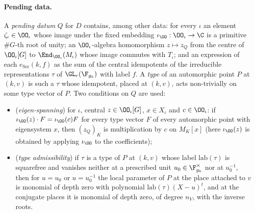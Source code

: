 \paragraph{Pending data.}
A \emph{pending datum} $Q$ for $D$ contains, among other data: for every $\iota$ an element $\zeta_\iota\in\OO_\iota$ whose image under
the fixed embedding $\iota_\OO:\OO_\iota\to\C$ is a primitive $\#G$-th root of unity; an $\OO_\iota$-algebra homomorphism $z\mapsto z_Q$
from the centre of $\OO_\iota[G]$ to $\End_{\OO_\iota}(M_\iota)$ whose image commutes with $T_\iota$; and an expression of each
$e_{\mathrm{Ser}}(k,f)$ as the sum of the central idempotents of the irreducible representations $\tau$ of $\GL_r(\F_{g_k})$ with
label $f$. A \emph{type} of an automorphic point $P$ at $(k,v)$ is such a $\tau$ whose idempotent, placed at $(k,v)$, acts non-trivially
on some type vector of $P$. Two conditions on $Q$ are used:
\begin{itemize}[leftmargin=3.2em]
\item[(Eig)] (\emph{eigen-spanning}) for $\iota$, central $z\in\OO_\iota[G]$, $x\in X_\iota$ and $c\in\OO_\iota$: if $\iota_\OO(z)\cdot F=\iota_\OO(c)F$
for every type vector $F$ of every automorphic point with eigensystem $x$, then $(z_Q)_K$ is multiplication by $c$ on $M_K[x]$
(here $\iota_\OO(z)$ is obtained by applying $\iota_\OO$ to the coefficients);
\item[(TA)] (\emph{type admissibility}) if $\tau$ is a type of $P$ at $(k,v)$ whose label $\mathrm{lab}(\tau)$ is squarefree and
vanishes neither at a prescribed unit $u_0\in\F_{g_k}^\times$ nor at $u_0^{-1}$, then for $u=u_0$ or $u=u_0^{-1}$ the local
parameter of $P$ at the place attached to $v$ is monomial of depth zero with polynomial $\mathrm{lab}(\tau)(X-u)^t$, and at
the conjugate places it is monomial of depth zero, of degree $n_V$, with the inverse roots.
\end{itemize}

